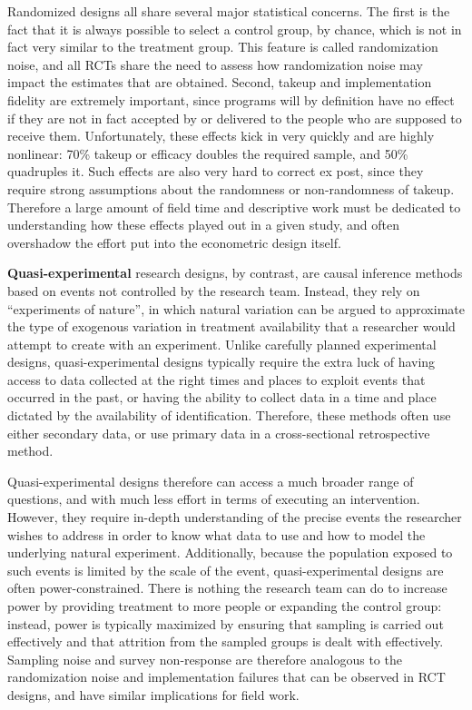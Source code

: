 Randomized designs all share several major statistical concerns.
The first is the fact that it is always possible to select a control group,
by chance, which is not in fact very similar to the treatment group.
This feature is called randomization noise, and all RCTs share the need to assess
how randomization noise may impact the estimates that are obtained.
Second, takeup and implementation fidelity are extremely important,
since programs will by definition have no effect
if they are not in fact accepted by or delivered to
the people who are supposed to receive them.
Unfortunately, these effects kick in very quickly and are highly nonlinear:
70\% takeup or efficacy doubles the required sample, and 50\% quadruples it.
Such effects are also very hard to correct ex post,
since they require strong assumptions about the randomness or non-randomness of takeup.
Therefore a large amount of field time and descriptive work
must be dedicated to understanding how these effects played out in a given study,
and often overshadow the effort put into the econometric design itself.

\textbf{Quasi-experimental} research designs,
by contrast, are causal inference methods based on events not controlled by the research team.
Instead, they rely on ``experiments of nature'',
in which natural variation can be argued to approximate
the type of exogenous variation in treatment availability
that a researcher would attempt to create with an experiment.\cite{dinardo2016natural}
Unlike carefully planned experimental designs,
quasi-experimental designs typically require the extra luck
of having access to data collected at the right times and places
to exploit events that occurred in the past,
or having the ability to collect data in a time and place
dictated by the availability of identification.
Therefore, these methods often use either secondary data,
or use primary data in a cross-sectional retrospective method.

Quasi-experimental designs therefore can access a much broader range of questions,
and with much less effort in terms of executing an intervention.
However, they require in-depth understanding of the precise events
the researcher wishes to address in order to know what data to use
and how to model the underlying natural experiment.
Additionally, because the population exposed
to such events is limited by the scale of the event,
quasi-experimental designs are often power-constrained.
There is nothing the research team can do to increase power
by providing treatment to more people or expanding the control group:
instead, power is typically maximized by ensuring
that sampling is carried out effectively
and that attrition from the sampled groups is dealt with effectively.
Sampling noise and survey non-response are therefore analogous
to the randomization noise and implementation failures
that can be observed in RCT designs, and have similar implications for field work.

